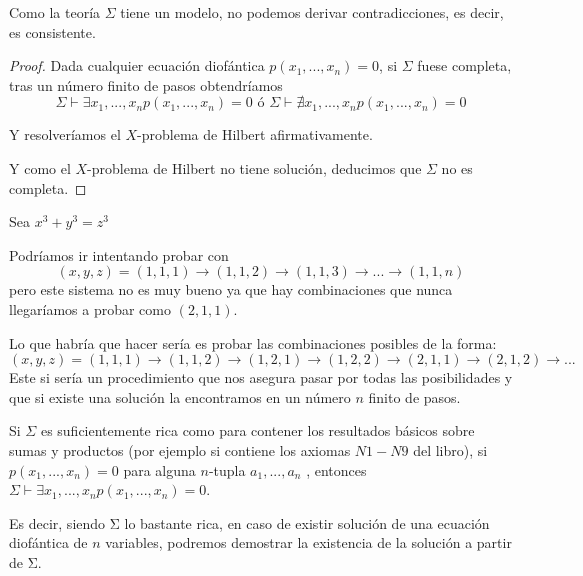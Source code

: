 \obs Como la teoría $Σ$ tiene un modelo, no podemos derivar contradicciones, es decir, es consistente.

\begin{proof}
Dada cualquier ecuación diofántica $p(x_1,...,x_n) = 0$, si $Σ$ fuese completa, tras un número finito de pasos obtendríamos
\[Σ\vdash ∃x_1,...,x_n p(x_1,...,x_n) = 0 \text{ ó } Σ\vdash \nexists x_1,...,x_n p(x_1,...,x_n) = 0\]

Y resolveríamos el $X$-problema de Hilbert afirmativamente.

Y como el $X$-problema de Hilbert no tiene solución, deducimos que $Σ$ no es completa.
\end{proof}



\begin{example}
Sea $x^3 + y^3 = z^3$

Podríamos ir intentando probar con
\[(x,y,z) = (1,1,1) \to (1,1,2) \to (1,1,3) \to ... \to (1,1,n)\]
pero este sistema no es muy bueno ya que hay combinaciones que nunca llegaríamos a probar como $(2,1,1)$.

Lo que habría que hacer sería es probar las combinaciones posibles de la forma:
\[(x,y,z) = (1,1,1) \to (1,1,2) \to (1,2,1) \to (1,2,2) \to (2,1,1) \to (2,1,2) \to ...\]
Este si sería un procedimiento que nos asegura pasar por todas las posibilidades y que si existe una solución la encontramos en un número $n$ finito de pasos.
\end{example}

\obs Si $Σ$ es suficientemente rica como para contener los resultados básicos sobre sumas y productos (por ejemplo si contiene los axiomas $N1 - N9$ del libro), si $p(x_1,...,x_n) = 0$ para alguna $n$-tupla $a_1,...,a_n$ , entonces $Σ\vdash ∃x_1,...,x_n p(x_1,...,x_n ) = 0$.

Es decir, siendo Σ lo bastante rica, en caso de existir solución de una ecuación diofántica de $n$ variables, podremos demostrar la existencia de la solución a partir de Σ.


